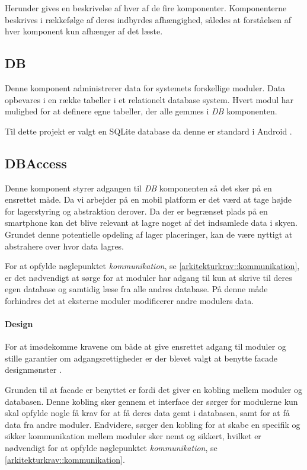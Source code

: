 Herunder gives en beskrivelse af hver af de fire komponenter.
Komponenterne beskrives i rækkefølge af deres indbyrdes afhængighed, således at forståelsen af hver komponent kun afhænger af det læste.

\subsection{DB}
Denne komponent administrerer data for systemets forskellige moduler.
Data opbevares i en række tabeller i et relationelt database system.
Hvert modul har mulighed for at definere egne tabeller, der alle gemmes i \textit{DB} komponenten.

Til dette projekt er valgt en SQLite database da denne er standard i Android \cite{android_database}.


\subsection{DBAccess}\label{subsec:DBACCESS}
Denne komponent styrer adgangen til \textit{DB} komponenten så det sker på en ensrettet måde.
Da vi arbejder på en mobil platform er det værd at tage højde for lagerstyring og abstraktion derover.
Da der er begrænset plads på en smartphone kan det blive relevant at lagre noget af det indsamlede data i skyen.
Grundet denne potentielle opdeling af lager placeringer, kan de være nyttigt at abstrahere over hvor data lagres.

For at opfylde nøglepunktet \textit{kommunikation}, se \cref{arkitekturkrav::kommunikation}, er det nødvendigt at sørge for at moduler har adgang til kun at skrive til deres egen database og samtidig læse fra alle andres database.
På denne måde forhindres det at eksterne moduler modificerer andre modulers data.

\paragraph{Design} 
For at imødekomme kravene om både at give ensrettet adgang til moduler og stille garantier om adgangsrettigheder er der blevet valgt at benytte facade designmønster \citep[s.~185]{gamma1994design}.

Grunden til at facade er benyttet er fordi det giver en kobling mellem moduler og databasen.
Denne kobling sker gennem et interface der sørger for modulerne kun skal opfylde nogle få krav for at få deres data gemt i databasen, samt for at få data fra andre moduler.
Endvidere, sørger den kobling for at skabe en specifik og sikker kommunikation mellem moduler sker nemt og sikkert, hvilket er nødvendigt for at opfylde nøglepunktet \textit{kommunikation}, se \cref{arkitekturkrav::kommunikation}.

